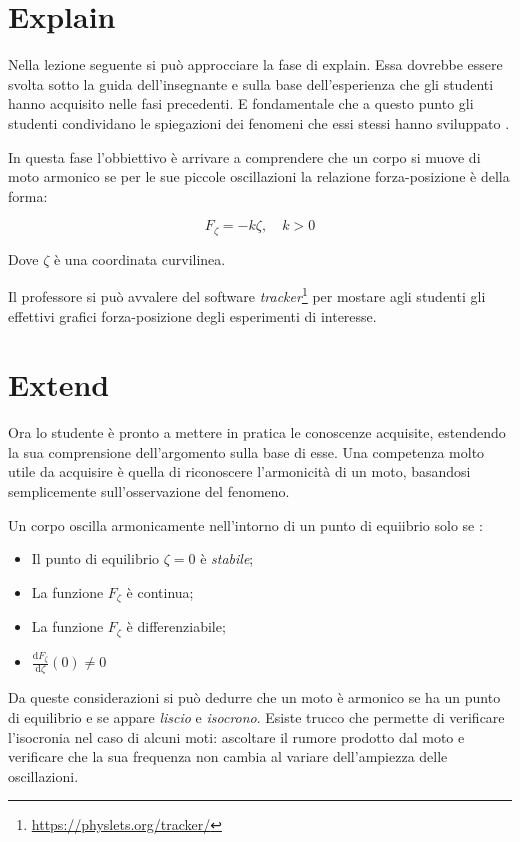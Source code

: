 \documentclass{article}
\begin{document}
\section{Explain}
Nella lezione seguente si può approcciare la fase di explain.
Essa dovrebbe essere svolta sotto la guida dell'insegnante e 
sulla base dell'esperienza che gli studenti hanno acquisito nelle
fasi precedenti. E fondamentale che a questo punto gli studenti
condividano le spiegazioni dei fenomeni che essi stessi
hanno sviluppato \cite{duran20045e}.

In questa fase l'obbiettivo è arrivare a comprendere che
un corpo si muove di moto armonico se per le sue piccole
oscillazioni la relazione forza-posizione è della forma:

\begin{equation}
F_{\zeta}=-k\zeta, \quad k>0
\end{equation}

Dove $\zeta$ è una coordinata curvilinea. 

Il professore si può avvalere del software
\emph{tracker}\footnote{\url{https://physlets.org/tracker/}}
per mostare agli studenti gli effettivi grafici forza-posizione
degli esperimenti di interesse.

\section{Extend}
Ora lo studente è pronto a mettere in pratica le conoscenze
acquisite, estendendo la sua comprensione dell'argomento
sulla base di esse. Una competenza molto utile da acquisire
è quella di riconoscere l'armonicità di un moto, basandosi
semplicemente sull'osservazione del fenomeno.

Un corpo oscilla armonicamente nell'intorno di un punto
di equiibrio solo se \cite{giliberti2014detecting}:

\begin{itemize}
\item Il punto di equilibrio $\zeta=0$ è \emph{stabile};
\item La funzione $F_{\zeta}$ è continua;
\item La funzione $F_{\zeta}$ è differenziabile;
\item $\frac{\mathrm{d}F_{\zeta}}{\mathrm{d}\zeta}(0) \neq 0$
\end{itemize}

Da queste considerazioni si può dedurre che un moto
è armonico se ha un punto di equilibrio e se appare
\emph{liscio} e \emph{isocrono}.
Esiste trucco che permette di verificare l'isocronia
nel caso di alcuni moti: ascoltare il rumore prodotto
dal moto e verificare che la sua frequenza non cambia al
variare dell'ampiezza delle oscillazioni.
\end{document}
